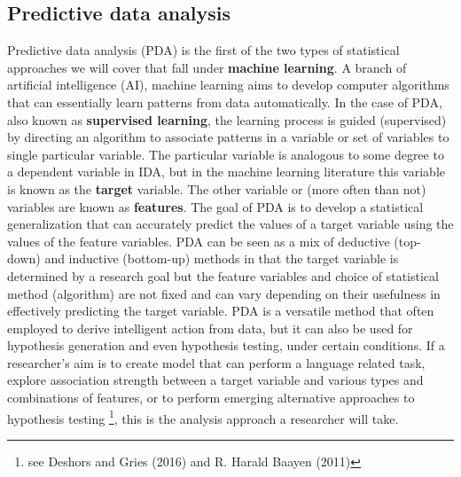 \documentclass[
  letterpaper,
]{scrbook}
\begin{document}
\hypertarget{predictive-data-analysis}{%
\subsection{Predictive data analysis}\label{predictive-data-analysis}}

Predictive data analysis (PDA) is the first of the two types of
statistical approaches we will cover that fall under \textbf{machine
learning}. A branch of artificial intelligence (AI), machine learning
aims to develop computer algorithms that can essentially learn patterns
from data automatically. In the case of PDA, also known as
\textbf{supervised learning}, the learning process is guided
(supervised) by directing an algorithm to associate patterns in a
variable or set of variables to single particular variable. The
particular variable is analogous to some degree to a dependent variable
in IDA, but in the machine learning literature this variable is known as
the \textbf{target} variable. The other variable or (more often than
not) variables are known as \textbf{features}. The goal of PDA is to
develop a statistical generalization that can accurately predict the
values of a target variable using the values of the feature variables.
PDA can be seen as a mix of deductive (top-down) and inductive
(bottom-up) methods in that the target variable is determined by a
research goal but the feature variables and choice of statistical method
(algorithm) are not fixed and can vary depending on their usefulness in
effectively predicting the target variable. PDA is a versatile method
that often employed to derive intelligent action from data, but it can
also be used for hypothesis generation and even hypothesis testing,
under certain conditions. If a researcher's aim is to create model that
can perform a language related task, explore association strength
between a target variable and various types and combinations of
features, or to perform emerging alternative approaches to hypothesis
testing \footnote{see Deshors and Gries (2016) and R. Harald Baayen
  (2011)}, this is the analysis approach a researcher will take.
\end{document}
